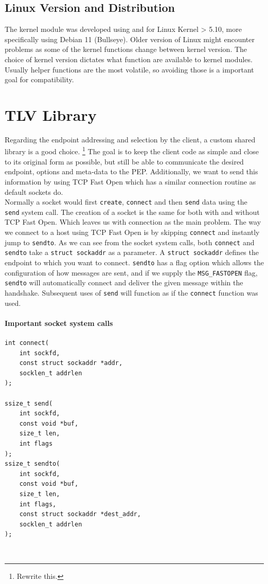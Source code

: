 \documentclass[a4paper,english, 11pt]{report}
\begin{document}
\subsection{Linux Version and Distribution}
The kernel module was developed using and for Linux Kernel > 5.10, more specifically using Debian 11 (Bullseye). Older version of Linux might encounter problems as some of the kernel functions change between kernel version. The choice of kernel version dictates what function are available to kernel modules. Usually helper functions are the most volatile, so avoiding those is a important goal for compatibility. 

\section{TLV Library}
Regarding the endpoint addressing and selection by the client, a custom shared library is a good choice.
\footnote{Rewrite this.} The goal is to keep the client code as simple and close to its original form as possible, but still be able to communicate the desired endpoint, options and meta-data to the PEP. Additionally, we want to send this information by using TCP Fast Open which has a similar connection routine as default sockets do.\\

Normally a socket would first \verb|create|, \verb|connect| and then \verb|send| data using the \verb|send| system call. The creation of a socket is the same for both with and without TCP Fast Open. Which leaves us with connection as the main problem. The way we connect to a host using TCP Fast Open is by skipping \verb|connect| and instantly jump to \verb|sendto|. As we can see from the socket system calls, both \verb|connect| and \verb|sendto| take a \verb|struct sockaddr| as a parameter. A \verb|struct sockaddr| defines the endpoint to which you want to connect. \verb|sendto| has a flag option which allows the configuration of how messages are sent, and if we supply the \verb|MSG_FASTOPEN| flag, \verb|sendto| will automatically connect and deliver the given message within the handshake. Subsequent uses of \verb|send| will function as if the \verb|connect| function was used.\\

\noindent\begin{minipage}{\linewidth}
\paragraph{Important socket system calls}
\begin{verbatim}
int connect(
    int sockfd,
    const struct sockaddr *addr,
    socklen_t addrlen
);

ssize_t send(
    int sockfd,
    const void *buf,
    size_t len,
    int flags
);
ssize_t sendto(
    int sockfd,
    const void *buf,
    size_t len,
    int flags,
    const struct sockaddr *dest_addr,
    socklen_t addrlen
);
\end{verbatim}
\end{minipage}\\
\end{document}
